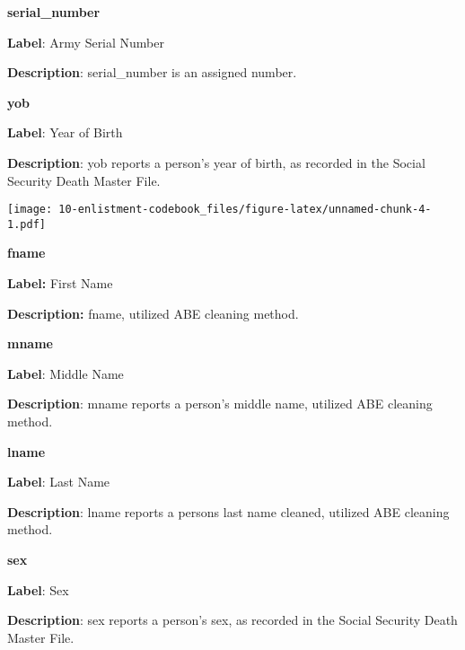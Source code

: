 \documentclass[
]{article}
\begin{document}
\newpage

\textbf{\huge serial\_number} \normalsize \vspace{12pt}

\textbf{Label}: Army Serial Number

\textbf{Description}: serial\_number is an assigned number.

\newpage

\textbf{\huge yob } \normalsize \vspace{12pt}

\textbf{Label}: Year of Birth

\textbf{Description}: yob reports a person's year of birth, as recorded
in the Social Security Death Master File.

\vspace{75pt}

\texttt{[image: 10-enlistment-codebook\_files/figure-latex/unnamed-chunk-4-1.pdf]}

\newpage

\textbf{\huge fname } \normalsize \vspace{12pt}

\textbf{Label:} First Name

\textbf{Description:} fname, utilized ABE cleaning method.

\newpage

\textbf{\huge mname } \normalsize \vspace{12pt}

\textbf{Label}: Middle Name

\textbf{Description}: mname reports a person's middle name, utilized ABE
cleaning method.

\newpage

\textbf{\huge lname } \normalsize \vspace{12pt}

\textbf{Label}: Last Name

\textbf{Description}: lname reports a persons last name cleaned,
utilized ABE cleaning method.

\vspace{30pt}

\newpage

\textbf{\huge sex } \normalsize \vspace{12pt}

\textbf{Label}: Sex

\textbf{Description}: sex reports a person's sex, as recorded in the
Social Security Death Master File.

\vspace{75pt}
\end{document}
